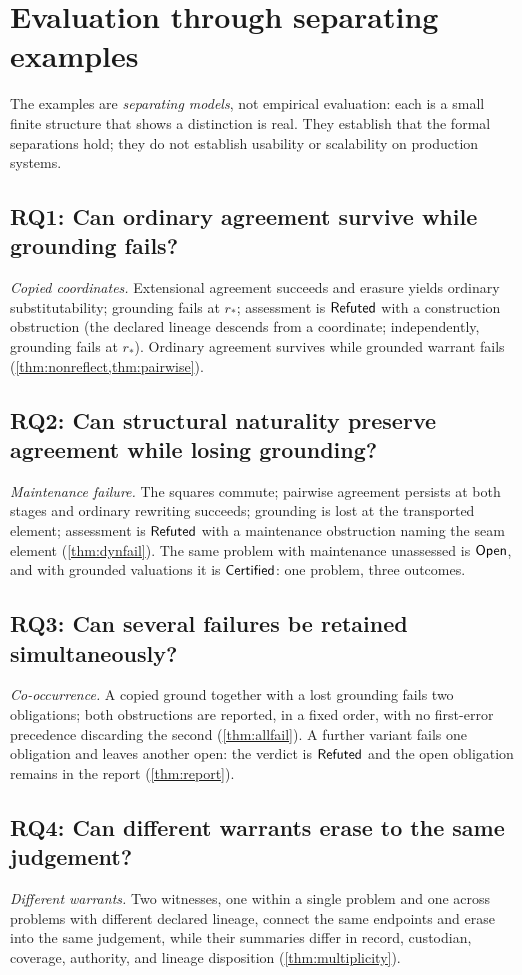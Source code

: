 \section{Evaluation through separating examples}\label{sec:evaluation}

The examples are \emph{separating models}, not empirical evaluation: each is a small finite structure that shows a distinction is real. They establish that the formal separations hold; they do not establish usability or scalability on production systems.

\subsection{RQ1: Can ordinary agreement survive while grounding fails?}
\emph{Copied coordinates.} Extensional agreement succeeds and erasure yields ordinary substitutability; grounding fails at $r_*$; assessment is $\mathsf{Refuted}$ with a construction obstruction (the declared lineage descends from a coordinate; independently, grounding fails at $r_*$). Ordinary agreement survives while grounded warrant fails (\cref{thm:nonreflect,thm:pairwise}).

\subsection{RQ2: Can structural naturality preserve agreement while losing grounding?}
\emph{Maintenance failure.} The squares commute; pairwise agreement persists at both stages and ordinary rewriting succeeds; grounding is lost at the transported element; assessment is $\mathsf{Refuted}$ with a maintenance obstruction naming the seam element (\cref{thm:dynfail}). The same problem with maintenance unassessed is $\mathsf{Open}$, and with grounded valuations it is $\mathsf{Certified}$: one problem, three outcomes.

\subsection{RQ3: Can several failures be retained simultaneously?}
\emph{Co-occurrence.} A copied ground together with a lost grounding fails two obligations; both obstructions are reported, in a fixed order, with no first-error precedence discarding the second (\cref{thm:allfail}). A further variant fails one obligation and leaves another open: the verdict is $\mathsf{Refuted}$ and the open obligation remains in the report (\cref{thm:report}).

\subsection{RQ4: Can different warrants erase to the same judgement?}
\emph{Different warrants.} Two witnesses, one within a single problem and one across problems with different declared lineage, connect the same endpoints and erase into the same judgement, while their summaries differ in record, custodian, coverage, authority, and lineage disposition (\cref{thm:multiplicity}).

